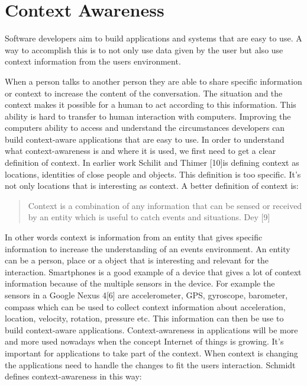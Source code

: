 \chapter{Context Awareness}
Software developers aim to build applications and systems that are easy to use. A way to accomplish this is to not only use data given by the user but also use context information from the users environment.

When a person talks to another person they are able to share specific information or context to increase the content of the conversation. The situation and the context makes it possible for a human to act according to this information. 
This ability is hard to transfer to human interaction with computers. Improving the computers ability to access and understand the circumstances developers can build context-aware applications that are easy to use. In order to understand what context-awareness is and where it is used, we first need to get a clear definition of context.
In earlier work Schilit and Thimer [10]is defining context as locations, identities of close people and objects. This definition is too specific. It's not only locations that is interesting as context. A better definition of context is:

\begin{quotation}
Context is a combination of any information that can be sensed or received by an entity which is useful to catch events and situations. Dey [9]
\end{quotation}

In other words context is information from an entity that gives specific information to increase the understanding of an events environment. An entity can be a person, place or a object that is interesting and relevant for the interaction. Smartphones is a good example of a device that gives a lot of context information because of the multiple sensors in the device. For example the sensors in a Google Nexus 4[6] are accelerometer, GPS, gyroscope, barometer, compass which can be used to collect context information about acceleration, location, velocity, rotation, pressure etc. This information can then be use to build context-aware applications. Context-awareness in applications will be more and more used nowadays when the concept Internet of things is growing. It's important for applications to take part of the context. When context is changing the applications need to handle the changes to fit the users interaction. Schmidt defines context-awareness in this way:

